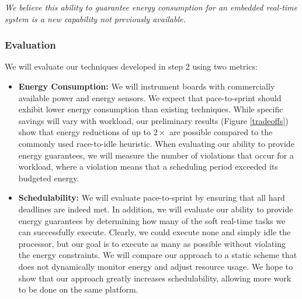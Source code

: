 \emph{We believe this ability to guarantee energy consumption for an
  embedded real-time system is a new capability not previously
  available.}


\subsubsection{Evaluation}
We will evaluate our techniques developed in step 2 using two metrics:
\begin{itemize}
\item \textbf{Energy Consumption:} We will instrument boards with
  commercially available power and energy sensors.  We expect that
  pace-to-sprint should exhibit lower energy consumption than existing
  techniques.  While specific savings will vary with workload, our
  preliminary results (Figure \ref{tradeoffs}) show that energy
  reductions of up to $2 \times$ are possible compared to the commonly
  used race-to-idle heuristic.  When evaluating our ability to provide
  energy guarantees, we will measure the number of violations that
  occur for a workload, where a violation means that a scheduling
  period exceeded its budgeted energy.
\item \textbf{Schedulability:} We will evaluate pace-to-sprint by
  ensuring that all hard deadlines are indeed met.  In addition, we
  will evaluate our ability to provide energy guarantees by
  determining how many of the soft real-time tasks we can successfully
  execute.  Clearly, we could execute none and simply idle the
  processor, but our goal is to execute as many as possible without
  violating the energy constraints.  We will compare our approach to a
  static scheme that does not dynamically monitor energy and adjust
  resource usage.  We hope to show that our approach greatly increases
  schedulability, allowing more work to be done on the same platform.
\end{itemize}


